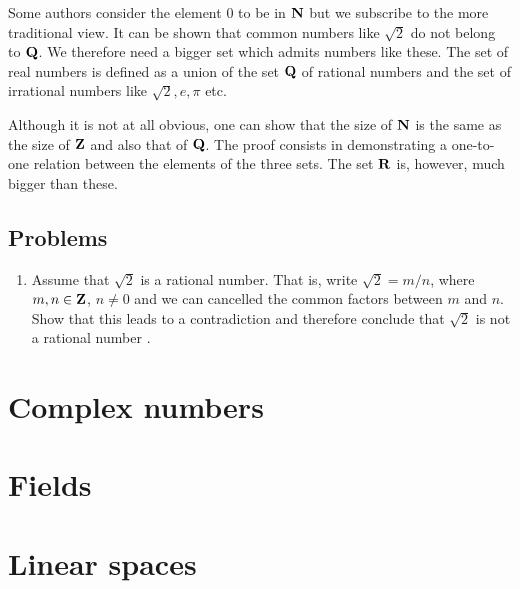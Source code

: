 Some authors consider the element $0$ to be in $\mathbf{N}$ but we subscribe to the more 
traditional view. It can be shown that common numbers like $\sqrt{2}$ do not belong 
to $\mathbf{Q}$. We therefore need a bigger set which admits numbers like these. The set 
of real numbers is defined as a union of the set $\mathbf{Q}$ of rational numbers and the 
set of irrational numbers like $\sqrt{2}, e, \pi$ etc. 

Although it is not at all obvious, one can show that the size of $\mathbf{N}$ is the same
as the size of $\mathbf{Z}$ and also that of $\mathbf{Q}$. The proof consists in demonstrating
a one-to-one relation between the elements of the three sets. The set $\mathbf{R}$ is,
however, much bigger than these.

\subsection{Problems}
\begin{enumerate}
\item Assume that $\sqrt{2}$ is a rational number. That is, write $\sqrt{2} = m/n$,
where $m, n \in \mathbf{Z}$, $n \ne 0$ and we can cancelled the common factors between $m$
and $n$. Show that this leads to a contradiction and therefore conclude that $\sqrt{2}$
is not a rational number \cite{hardy1992mathematician}.
\end{enumerate}

\section{Complex numbers}\label{c1s3}
\section{Fields}\label{c1s4}
\section{Linear spaces}\label{c1s5}